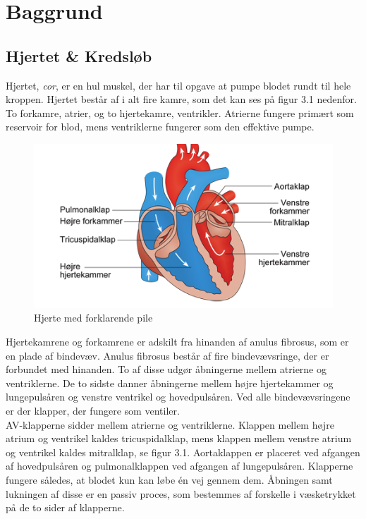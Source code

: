 \chapter{Baggrund}
\section{Hjertet \& Kredsløb}
Hjertet, \textit{cor}, er en hul muskel, der har til opgave at pumpe blodet rundt til hele kroppen. Hjertet består af i alt fire kamre, som det kan ses på figur 3.1 nedenfor. To forkamre, atrier, og to hjertekamre, ventrikler. Atrierne fungere primært som reservoir for blod, mens ventriklerne fungerer som den effektive pumpe.\\

\begin{figure}[htb]
	\centering
	\includegraphics[width=1\textwidth]{Figurer/Fysio/Hjertet}
	\caption{Hjerte med forklarende pile \protect\cite{Hjertet}}
	\label{Hjeret} 
\end{figure}


Hjertekamrene og forkamrene er adskilt fra hinanden af anulus fibrosus, som er en plade af bindevæv. Anulus fibrosus består af fire bindevævsringe, der er forbundet med hinanden. To af disse udgør åbningerne mellem atrierne og ventriklerne. De to sidste danner åbningerne mellem højre hjertekammer og lungepulsåren og venstre ventrikel og hovedpulsåren. Ved alle bindevævsringene er der klapper, der fungere som ventiler.\\ 
AV-klapperne sidder mellem atrierne og ventriklerne. Klappen mellem højre atrium og ventrikel kaldes tricuspidalklap, mens klappen mellem venstre atrium og ventrikel kaldes mitralklap, se figur 3.1. Aortaklappen er placeret ved afgangen af hovedpulsåren og pulmonalklappen ved afgangen af lungepulsåren. Klapperne fungere således, at blodet kun kan løbe én vej gennem dem. Åbningen samt lukningen af disse er en passiv proces, som bestemmes af forskelle i væsketrykket på de to sider af klapperne.\\ 


